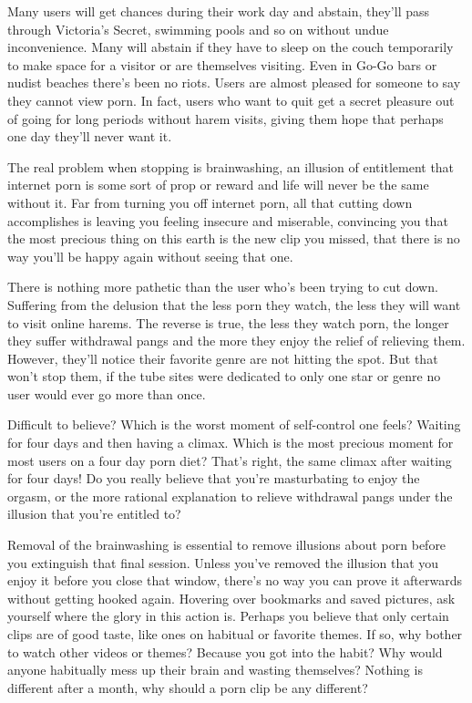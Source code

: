 \documentclass[easypeasy.tex]{subfiles}
\begin{document}
Many users will get chances during their work day and abstain, they'll pass through Victoria's Secret, swimming pools and so on without undue inconvenience. Many will abstain if they have to sleep on the couch temporarily to make space for a visitor or are themselves visiting. Even in Go-Go bars or nudist beaches there's been no riots. Users are almost pleased for someone to say they cannot view porn. In fact, users who want to quit get a secret pleasure out of going for long periods without harem visits, giving them hope that perhaps one day they'll never want it.

The real problem when stopping is brainwashing, an illusion of entitlement that internet porn is some sort of prop or reward and life will never be the same without it. Far from turning you off internet porn, all that cutting down accomplishes is leaving you feeling insecure and miserable, convincing you that the most precious thing on this earth is the new clip you missed, that there is no way you'll be happy again without seeing that one.

There is nothing more pathetic than the user who's been trying to cut down. Suffering from the delusion that the less porn they watch, the less they will want to visit online harems. The reverse is true, the less they watch porn, the longer they suffer withdrawal pangs and the more they enjoy the relief of relieving them. However, they'll notice their favorite genre are not hitting the spot. But that won't stop them, if the tube sites were dedicated to only one star or genre no user would ever go more than once.

Difficult to believe? Which is the worst moment of self-control one feels? Waiting for four days and then having a climax. Which is the most precious moment for most users on a four day porn diet? That's right, the same climax after waiting for four days! Do you really believe that you're masturbating to enjoy the orgasm, or the more rational explanation to relieve withdrawal pangs under the illusion that you're entitled to?

Removal of the brainwashing is essential to remove illusions about porn before you extinguish that final session. Unless you've removed the illusion that you enjoy it before you close that window, there's no way you can prove it afterwards without getting hooked again. Hovering over bookmarks and saved pictures, ask yourself where the glory in this action is. Perhaps you believe that only certain clips are of good taste, like ones on habitual or favorite themes. If so, why bother to watch other videos or themes? Because you got into the habit? Why would anyone habitually mess up their brain and wasting themselves? Nothing is different after a month, why should a porn clip be any different?
\end{document}
